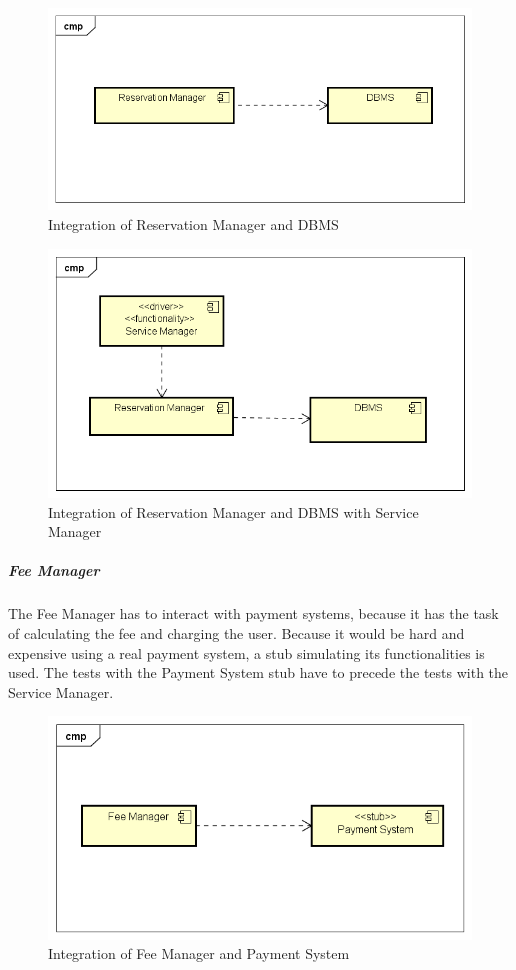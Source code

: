 \begin{figure}[H]	
	\centering
	\includegraphics[width=\textwidth]{img/ResMan_DBMS_int}
	\caption{Integration of Reservation Manager and DBMS}
\end{figure}

\begin{figure}[H]	
	\centering
	\includegraphics[width=\textwidth]{img/ResMan_SrvMan_int}
	\caption{Integration of Reservation Manager and DBMS with Service Manager}
\end{figure}
\subparagraph{Fee Manager}
The Fee Manager has to interact with payment systems, because it has the task of calculating the fee and charging the user. Because it would be hard and expensive using a real payment system, a stub simulating its functionalities is used. The tests with the Payment System stub have to precede the tests with the Service Manager. 


\begin{figure}[H]	
	\centering
	\includegraphics[width=\textwidth]{img/FeeMan_PaySys_int}
	\caption{Integration of Fee Manager and Payment System}
\end{figure}

